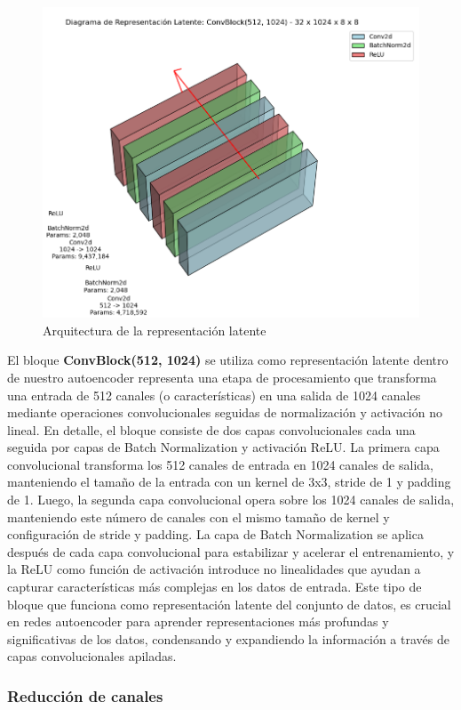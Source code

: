 \begin{figure}[H]
	\centering
	\includegraphics[width=0.8\linewidth]{imagenes/bottleneck_arch.png}
	\caption{Arquitectura de la representación latente}
\end{figure}

El bloque \textbf{ConvBlock(512, 1024)} se utiliza como representación latente dentro de nuestro autoencoder representa una etapa de procesamiento que transforma una entrada de 512 canales (o características) en una salida de 1024 canales mediante operaciones convolucionales seguidas de normalización y activación no lineal. En detalle, el bloque consiste de dos capas convolucionales cada una seguida por capas de Batch Normalization y activación ReLU. La primera capa convolucional transforma los 512 canales de entrada en 1024 canales de salida, manteniendo el tamaño de la entrada con un kernel de 3x3, stride de 1 y padding de 1. Luego, la segunda capa convolucional opera sobre los 1024 canales de salida, manteniendo este número de canales con el mismo tamaño de kernel y configuración de stride y padding. La capa de Batch Normalization se aplica después de cada capa convolucional para estabilizar y acelerar el entrenamiento, y la ReLU como función de activación introduce no linealidades que ayudan a capturar características más complejas en los datos de entrada. Este tipo de bloque que funciona como representación latente del conjunto de datos, es crucial en redes autoencoder para aprender representaciones más profundas y significativas de los datos, condensando y expandiendo la información a través de capas convolucionales apiladas.

\subsubsection{Reducción de canales}

